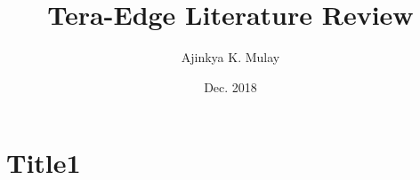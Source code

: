 \documentclass[12pt, letterpaper]{article}
\title{Tera-Edge Literature Review}
\author{Ajinkya K. Mulay}
\date{Dec. 2018}
\begin{document}
	\begin{titlepage}
		\maketitle
	\end{titlepage}
	
	\section{Title1}
	
\end{document}
